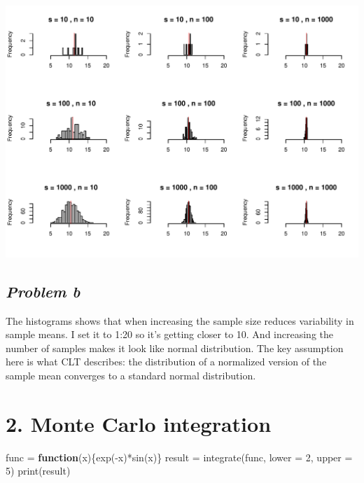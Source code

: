 \documentclass[
  letterpaper,
  DIV=11,
  numbers=noendperiod]{scrartcl}
\newenvironment{Shaded}{\begin{snugshade}}{\end{snugshade}}
\newcommand{\AttributeTok}[1]{\textcolor[rgb]{0.40,0.45,0.13}{#1}}
\newcommand{\ControlFlowTok}[1]{\textcolor[rgb]{0.00,0.23,0.31}{\textbf{#1}}}
\newcommand{\DecValTok}[1]{\textcolor[rgb]{0.68,0.00,0.00}{#1}}
\newcommand{\FunctionTok}[1]{\textcolor[rgb]{0.28,0.35,0.67}{#1}}
\newcommand{\NormalTok}[1]{\textcolor[rgb]{0.00,0.23,0.31}{#1}}
\newcommand{\OtherTok}[1]{\textcolor[rgb]{0.00,0.23,0.31}{#1}}
\newcommand{\SpecialCharTok}[1]{\textcolor[rgb]{0.37,0.37,0.37}{#1}}
\begin{document}
\includegraphics{problemset1_files/figure-pdf/unnamed-chunk-1-1.pdf}

\subsection{\texorpdfstring{\emph{Problem
b}}{Problem b}}\label{problem-b}

The histograms shows that when increasing the sample size reduces
variability in sample means. I set it to 1:20 so it's getting closer to
10. And increasing the number of samples makes it look like normal
distribution. The key assumption here is what CLT describes: the
distribution of a normalized version of the sample mean converges to a
standard normal distribution.

\section{2. Monte Carlo integration}\label{monte-carlo-integration}

\begin{Shaded}
\begin{Highlighting}[]
\NormalTok{func }\OtherTok{=} \ControlFlowTok{function}\NormalTok{(x)\{}\FunctionTok{exp}\NormalTok{(}\SpecialCharTok{{-}}\NormalTok{x)}\SpecialCharTok{*}\FunctionTok{sin}\NormalTok{(x)\}}
\NormalTok{result }\OtherTok{=} \FunctionTok{integrate}\NormalTok{(func, }\AttributeTok{lower =} \DecValTok{2}\NormalTok{, }\AttributeTok{upper =} \DecValTok{5}\NormalTok{)}
\FunctionTok{print}\NormalTok{(result)}
\end{Highlighting}
\end{Shaded}
\end{document}
